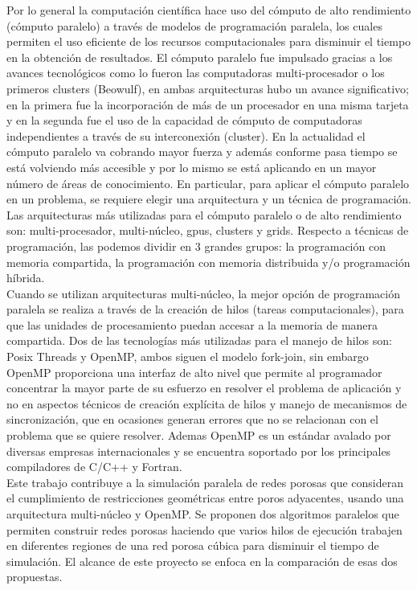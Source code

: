 Por lo general la computación científica hace uso  del cómputo de alto rendimiento (cómputo paralelo) a través de modelos de programación paralela, los cuales permiten  el uso eficiente de los recursos computacionales para disminuir el tiempo en la obtención de resultados.
El cómputo paralelo fue impulsado gracias a los avances tecnológicos como lo fueron las computadoras multi-procesador o los primeros clusters (Beowulf), en ambas arquitecturas hubo un avance significativo; en la primera fue la incorporación de más de un procesador en una misma tarjeta y en la segunda fue el uso de la capacidad de cómputo de computadoras independientes a través de su interconexión (cluster). En la actualidad el cómputo paralelo va cobrando mayor fuerza y además conforme pasa tiempo se está volviendo más accesible y por lo mismo se está aplicando en un mayor número de áreas de conocimiento. En particular, para aplicar el cómputo paralelo en un problema, se requiere elegir una arquitectura y un técnica de programación. Las arquitecturas más utilizadas para el cómputo paralelo o de alto rendimiento son: multi-procesador, multi-núcleo, gpus, clusters y grids. Respecto a técnicas de programación,  las podemos dividir en 3 grandes grupos: la programación con memoria compartida, la programación con memoria distribuida y/o programación híbrida.\\


Cuando se utilizan arquitecturas multi-núcleo, la mejor opción de programación paralela se realiza a través de la creación de hilos (tareas computacionales), para que las unidades de procesamiento puedan accesar a la memoria de manera compartida. Dos de las tecnologías más utilizadas para el manejo de hilos son: Posix Threads\cite{ref13} y OpenMP\cite{ref6}, ambos siguen el modelo fork-join, sin embargo OpenMP proporciona una interfaz de alto nivel que permite al programador concentrar la mayor parte de su esfuerzo en resolver el problema de aplicación y no en aspectos técnicos de creación explícita de hilos y manejo de mecanismos de sincronización, que en ocasiones generan errores que no se relacionan con el problema que se quiere resolver. Ademas OpenMP es un estándar avalado por diversas empresas internacionales y se encuentra soportado por los principales compiladores de C/C++ y Fortran.\\ 

Este trabajo contribuye a la simulación paralela de redes porosas que consideran el cumplimiento de restricciones geométricas entre poros adyacentes, usando una arquitectura multi-núcleo y OpenMP. Se proponen dos algoritmos paralelos que permiten construir redes porosas haciendo que varios hilos de ejecución trabajen en diferentes regiones de una red porosa cúbica para disminuir el tiempo de simulación. El alcance de este proyecto se enfoca en la comparación de esas dos propuestas. \\

